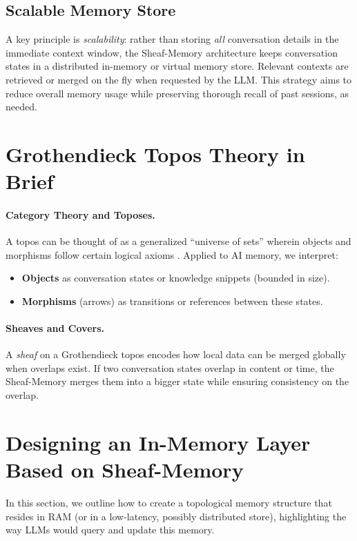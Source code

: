 \documentclass{article}
\begin{document}
\subsection{Scalable Memory Store}

A key principle is \emph{scalability}: rather than storing \emph{all} conversation details in the immediate context window, the Sheaf-Memory architecture keeps conversation states in a distributed in-memory or virtual memory store. Relevant contexts are retrieved or merged on the fly when requested by the LLM. This strategy aims to reduce overall memory usage while preserving thorough recall of past sessions, as needed.

\section{Grothendieck Topos Theory in Brief}
\label{sec:topos}

\paragraph{Category Theory and Toposes.}
A topos can be thought of as a generalized ``universe of sets'' wherein objects and morphisms follow certain logical axioms \citep{maclane1971categories}. Applied to AI memory, we interpret:
\begin{itemize}
    \item \textbf{Objects} as conversation states or knowledge snippets (bounded in size).
    \item \textbf{Morphisms} (arrows) as transitions or references between these states.
\end{itemize}

\paragraph{Sheaves and Covers.}
A \emph{sheaf} on a Grothendieck topos encodes how local data can be merged globally when overlaps exist. If two conversation states overlap in content or time, the Sheaf-Memory merges them into a bigger state while ensuring consistency on the overlap.

\section{Designing an In-Memory Layer Based on Sheaf-Memory}
\label{sec:in_memory_design}

In this section, we outline how to create a topological memory structure that resides in RAM (or in a low-latency, possibly distributed store), highlighting the way LLMs would query and update this memory.
\end{document}

